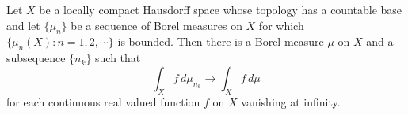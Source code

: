 Let $X$ be a locally compact Hausdorff space whose topology has a countable base and let $\{\mu_n\}$ be a sequence of Borel measures on $X$ for which $\{\mu_n(X): n = 1, 2, \cdots\}$ is bounded. Then there is a Borel measure $\mu$ on $X$ and a subsequence $\{n_k\}$ such that
$$
\int_X f \, d\mu_{n_k} \rightarrow \int_X f \, d\mu
$$
for each continuous real valued function $f$ on $X$ vanishing at infinity.
